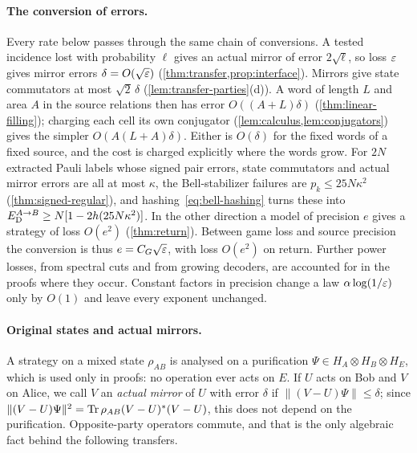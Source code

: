 \paragraph{The conversion of errors.} Every rate below passes through the same chain of conversions. A tested incidence lost
with probability $\ell$ gives an actual mirror of error $2\sqrt\ell$, so loss $\varepsilon$ gives mirror errors $\delta=O(\sqrt{\varepsilon})$
(\cref{thm:transfer,prop:interface}). Mirrors give state commutators at most $\sqrt2\,\delta$ (\cref{lem:transfer-parties}(d)). A word of
length $L$ and area $A$ in the source relations then has error $O((A+L)\delta)$ (\cref{thm:linear-filling}); charging each
cell its own conjugator (\cref{lem:calculus,lem:conjugators}) gives the simpler $O(A(L+A)\delta)$. Either is $O(\delta)$ for the
fixed words of a fixed source, and the cost is charged explicitly where the words grow. For $2N$ extracted Pauli labels whose
signed pair errors, state commutators and actual mirror errors are all at most $\kappa$, the Bell-stabilizer failures are
$p_k\le25N\kappa^2$ (\cref{thm:signed-regular}), and hashing~\eqref{eq:bell-hashing} turns these into
$E_{\mathrm D}^{A\to B}\ge N[1-2h(25N\kappa^2)]$. In the other direction a model of precision $e$ gives a strategy of loss $O(e^2)$
(\cref{thm:return}). Between game loss and source precision the conversion is thus $e=C_G\sqrt{\varepsilon}$, with loss $O(e^2)$ on return.
Further power losses, from spectral cuts and from growing decoders, are accounted for in the proofs where they occur. Constant
factors in precision change a law $\alpha\log(1/\varepsilon)$ only by $O(1)$ and leave every exponent unchanged.

\paragraph{Original states and actual mirrors.} A strategy on a mixed state $\rho_{AB}$ is analysed on a purification
$\Psi\in H_A\otimes H_B\otimes H_E$, which is used only in proofs: no operation ever acts on $E$. If $U$ acts on Bob and
$V$ on Alice, we call $V$ an \emph{actual mirror} of $U$ with error $\delta$ if $\|(V-U)\Psi\|\le\delta$; since
$\|(V-U)\Psi\|^2=\operatorname{Tr}\rho_{AB}(V-U)^*(V-U)$, this does not depend on the purification. Opposite-party operators commute,
and that is the only algebraic fact behind the following transfers.

